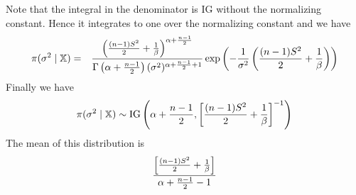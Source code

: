 Note that the integral in the denominator is IG without the
normalizing constant. Hence it integrates to one over the
normalizing constant and we have
\begin{eqnarray*}
\pi(\sigma^2\mid\mathbb X)&=&
%
{
\left({(n-1)S^2\over2}+{1\over\beta}\right)^{\alpha+{n-1\over2}}
\over
\Gamma\left(\alpha+{n-1\over2}\right)
(\sigma^2)^{\alpha+{n-1\over2}+1}
}
%
\exp\left(
-{1\over\sigma^2}\left({(n-1)S^2\over2}+{1\over\beta}\right)
\right)
\end{eqnarray*}
Finally we have
$$\pi(\sigma^2\mid\mathbb X)\sim{\rm IG}\left(\alpha+{n-1\over2},\left[{(n-1)S^2\over2}+{1\over\beta}\right]^{-1}\right)$$
The mean of this distribution is
$$
{
\left[{(n-1)S^2\over2}+{1\over\beta}\right]
\over
\alpha+{n-1\over2}-1
}$$


